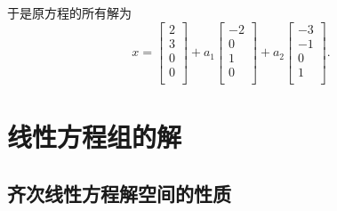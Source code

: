 \begin{itemize}
\begin{enumerate}
\begin{example}
            于是原方程的所有解为
            \begin{equation}
              x = \begin{bmatrix}
               2\\
               3\\
               0\\
               0\\
              \end{bmatrix}
              + a_1 \begin{bmatrix}
                -2\\
                0\\
                1\\
                0\\
            \end{bmatrix}+ a_2 \begin{bmatrix}
                -3\\
                -1\\
                0\\
                1\\
            \end{bmatrix}.
        \end{equation}
    \end{example}
\end{enumerate}
\end{itemize}

\section{线性方程组的解}
\subsection{齐次线性方程解空间的性质}
